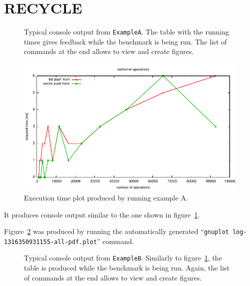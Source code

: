 \documentclass[a4paper,10pt]{article}
\begin{document}
\section*{RECYCLE}




\begin{figure}
  \centering
  \caption{
    Typical console output from \texttt{ExampleA}.
    The table with the running times gives feedback while the benchmark is being run.
    The list of commands at the end allows to view and create figures.
  }\label{fig:exa-console}
\end{figure}
  
\begin{figure}
  \centering
  \includegraphics[width=0.8\columnwidth]{plot-ExampleA.pdf}
  \caption{
    Execution time plot produced by running example A.
  }\label{fig:exa-plot}
\end{figure}

It produces console output similar to the one shown in figure~\ref{fig:exa-console}.

Figure~\ref{fig:exa-plot} was produced by running the automatically generated ``\texttt{gnuplot log-1316350931155-all-pdf.plot}'' command.


\begin{figure}
  \centering
  \caption{
    Typical console output from \texttt{ExampleB}.
    Similarly to figure~\ref{fig:exa-console}, the table is produced while the benchmark is being run.
    Again, the list of commands at the end allows to view and create figures.
  }\label{fig:exb-console}
\end{figure}
\end{document}
